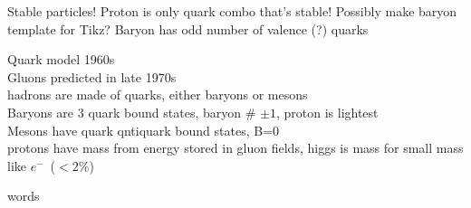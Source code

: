 \documentclass{article}
\def\elec{$e^{-}$\ }
\begin{document}
\begin{lecture}
    Stable particles! Proton is only quark combo that's stable! 
    Possibly make baryon template for Tikz? Baryon has odd number of valence (?) quarks
\end{lecture}
\begin{lecture}
    Quark model 1960s
    \\
    Gluons predicted in late 1970s
    \\
    hadrons are made of quarks, either baryons or mesons
    \\
    Baryons are 3 quark bound states, baryon \# $\pm1$, proton is lightest
    \\
    Mesons have quark qntiquark bound states, B=0 
    \\
    protons have mass from energy stored in gluon fields, higgs is mass for small mass like \elec ($<2\%$)
\end{lecture}
words
\end{document}
